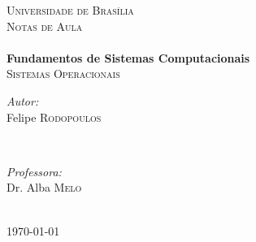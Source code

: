 \documentclass[a4paper, 11pt, twoside]{book}
\begin{document}
	\frontmatter

	\begin{titlepage}
		\thispagestyle{empty}
		\center

		\textsc{\LARGE Universidade de Brasília}\\[1.5cm] %
		\textsc{\Large Notas de Aula}\\[5cm] %

		\HRule \\[0.4cm]
		{\huge \bfseries Fundamentos de Sistemas Computacionais}\\[0.4cm]
		{\Large \textsc{Sistemas Operacionais}}
		\HRule \\[6.5cm]

		\begin{minipage}{0.4\textwidth}
		\begin{flushleft} \large
		\emph{Autor:}\\
		Felipe \textsc{Rodopoulos} %
		\end{flushleft}
		\end{minipage}
		~
		\begin{minipage}{0.4\textwidth}
		\begin{flushright} \large
		\emph{Professora:} \\
		Dr. Alba \textsc{Melo} %
		\end{flushright}
		\end{minipage}\\[2cm]

		\vfill
		{\large \today}\\[2cm]
	\end{titlepage}








	\restoregeometry

	\tableofcontents

	\mainmatter
	
	
	
	
	
	
	
	
	\nocite{*}

  \appendix
  
\end{document}
